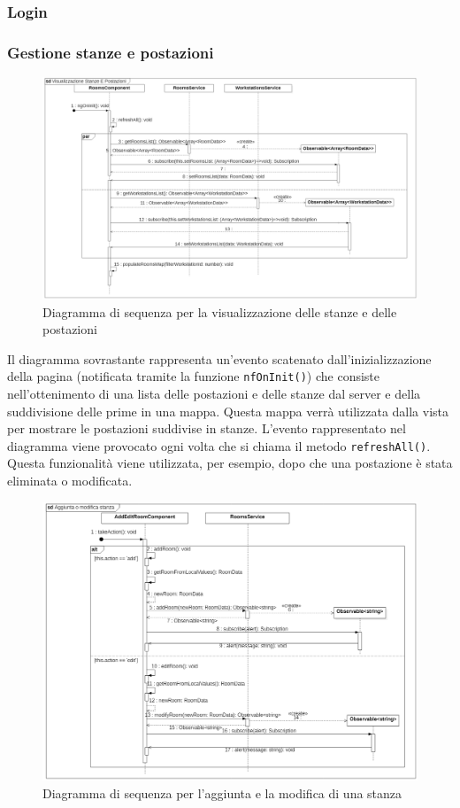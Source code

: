 \subsubsection{Login}
\subsubsection{Gestione stanze e postazioni}
\begin{figure}[H]
	\centering
	\includegraphics[width=18cm]{res/images/webapp-visualStanzePostazioni-diagrammaSequenza.png}
	\caption{Diagramma di sequenza per la visualizzazione delle stanze e delle postazioni}
	\label{fig:DiagrammaSequenzaStanzePostazioni1}
\end{figure}
Il diagramma sovrastante rappresenta un'evento scatenato dall'inizializzazione della pagina (notificata tramite la funzione \texttt{nfOnInit()}) che consiste nell'ottenimento di una lista delle postazioni e delle stanze dal server e della suddivisione delle prime in una mappa. Questa mappa verrà utilizzata dalla vista per mostrare le postazioni suddivise in stanze. L'evento rappresentato nel diagramma viene provocato ogni volta che si chiama il metodo \texttt{refreshAll()}. Questa funzionalità viene utilizzata, per esempio, dopo che una postazione è stata eliminata o modificata.
\begin{figure}[H]
	\centering
	\includegraphics[width=18cm]{res/images/webapp-addEditStanzePostazioni-diagrammaSequenza.png}
	\caption{Diagramma di sequenza per l'aggiunta e la modifica di una stanza}
	\label{fig:DiagrammaSequenzaStanzePostazioni2}
\end{figure}
